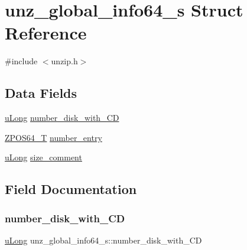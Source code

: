 \hypertarget{structunz__global__info64__s}{}\section{unz\+\_\+global\+\_\+info64\+\_\+s Struct Reference}
\label{structunz__global__info64__s}


{\ttfamily \#include $<$unzip.\+h$>$}

\subsection*{Data Fields}
\begin{DoxyCompactItemize}
\item 
\hyperlink{ioapi_8h_a50e9e9d5c30e481de822ad68fe537986}{u\+Long} \hyperlink{structunz__global__info64__s_a05ba95d7eece12dbd89fc09cf5c62a6e}{number\+\_\+disk\+\_\+with\+\_\+\+CD}
\item 
\hyperlink{ioapi_8h_afffed08ed7f2413fa38e12a223ae0e72}{Z\+P\+O\+S64\+\_\+T} \hyperlink{structunz__global__info64__s_a628f94ac445f2a6cd64c9e82d481e738}{number\+\_\+entry}
\item 
\hyperlink{ioapi_8h_a50e9e9d5c30e481de822ad68fe537986}{u\+Long} \hyperlink{structunz__global__info64__s_ad9440fb3b019cfdac9ba8b8d83026ffc}{size\+\_\+comment}
\end{DoxyCompactItemize}


\subsection{Field Documentation}
\mbox{\label{structunz__global__info64__s_a05ba95d7eece12dbd89fc09cf5c62a6e}} 
\subsubsection{\texorpdfstring{number\+\_\+disk\+\_\+with\+\_\+\+CD}{number\_disk\_with\_CD}}
{\footnotesize\ttfamily \hyperlink{ioapi_8h_a50e9e9d5c30e481de822ad68fe537986}{u\+Long} unz\+\_\+global\+\_\+info64\+\_\+s\+::number\+\_\+disk\+\_\+with\+\_\+\+CD}

